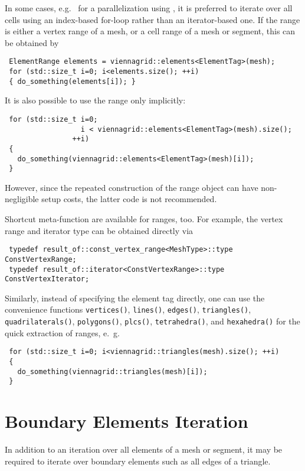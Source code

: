 In some cases, e.g.~ for a parallelization using \OpenMP \cite{openmp}, it is preferred to iterate over all cells using an index-based for-loop rather than an iterator-based one.
If the range is either a vertex range of a mesh, or a cell range of a mesh or segment, this can be obtained by
\begin{lstlisting}
 ElementRange elements = viennagrid::elements<ElementTag>(mesh);
 for (std::size_t i=0; i<elements.size(); ++i)
 { do_something(elements[i]); }
\end{lstlisting}
It is also possible to use the range only implicitly:
\begin{lstlisting}
 for (std::size_t i=0;
                  i < viennagrid::elements<ElementTag>(mesh).size();
                ++i)
 {
   do_something(viennagrid::elements<ElementTag>(mesh)[i]); 
 }
\end{lstlisting}
However, since the repeated construction of the range object can have non-negligible setup costs, the latter code is not recommended.


Shortcut meta-function are available for ranges, too.
For example, the vertex range and iterator type can be obtained directly via 
\begin{lstlisting}
 typedef result_of::const_vertex_range<MeshType>::type ConstVertexRange;
 typedef result_of::iterator<ConstVertexRange>::type   ConstVertexIterator;
\end{lstlisting}
Similarly, instead of specifying the element tag directly, one can use the convenience functions
\lstinline|vertices()|, \lstinline|lines()|, \lstinline|edges()|, \lstinline|triangles()|, \lstinline|quadrilaterals()|, \lstinline|polygons()|, \lstinline|plcs()|, \lstinline|tetrahedra()|, and \lstinline|hexahedra()| for the quick extraction of ranges, e.~g.
\begin{lstlisting}
 for (std::size_t i=0; i<viennagrid::triangles(mesh).size(); ++i)
 { 
   do_something(viennagrid::triangles(mesh)[i]); 
 }
\end{lstlisting}

\section{Boundary Elements Iteration}
In addition to an iteration over all elements of a mesh or segment, it may be required to iterate over boundary elements such as all edges of a triangle.

